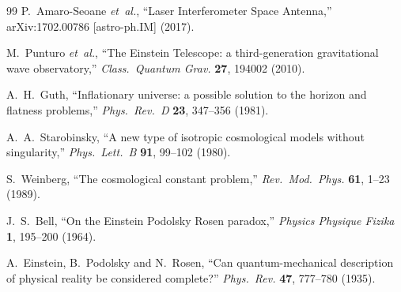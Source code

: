 \documentclass[a4paper]{article}
\begin{document}
\begin{thebibliography}{99}
P.~Amaro-Seoane \textit{et~al.},
``Laser Interferometer Space Antenna,''
arXiv:1702.00786 [astro-ph.IM] (2017).

M.~Punturo \textit{et~al.},
``The Einstein Telescope: a third-generation gravitational wave observatory,''
\textit{Class.\ Quantum Grav.} \textbf{27}, 194002 (2010).

A.~H.~Guth,
``Inflationary universe: a possible solution to the horizon and flatness problems,''
\textit{Phys.\ Rev.\ D} \textbf{23}, 347--356 (1981).

A.~A.~Starobinsky,
``A new type of isotropic cosmological models without singularity,''
\textit{Phys.\ Lett.\ B} \textbf{91}, 99--102 (1980).

S.~Weinberg,
``The cosmological constant problem,''
\textit{Rev.\ Mod.\ Phys.} \textbf{61}, 1--23 (1989).

J.~S.~Bell,
``On the Einstein Podolsky Rosen paradox,''
\textit{Physics Physique Fizika} \textbf{1}, 195--200 (1964).

A.~Einstein, B.~Podolsky and N.~Rosen,
``Can quantum-mechanical description of physical reality be considered complete?''
\textit{Phys.\ Rev.} \textbf{47}, 777--780 (1935).

\end{thebibliography}
\end{document}
